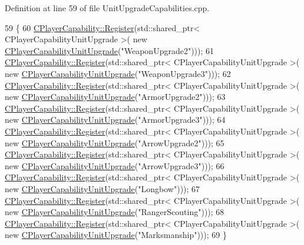 Definition at line 59 of file Unit\+Upgrade\+Capabilities.\+cpp.


\begin{DoxyCode}
59                                                     \{
60     \hyperlink{classCPlayerCapability_a7e298018dcde2684451add3cfff065f7}{CPlayerCapability::Register}(std::shared\_ptr< CPlayerCapabilityUnitUpgrade >(\textcolor{keyword}{
      new} \hyperlink{classCPlayerCapabilityUnitUpgrade_ac87129322f9f31cc271ee3de33502c56}{CPlayerCapabilityUnitUpgrade}(\textcolor{stringliteral}{"WeaponUpgrade2"})));   
61     \hyperlink{classCPlayerCapability_a7e298018dcde2684451add3cfff065f7}{CPlayerCapability::Register}(std::shared\_ptr< CPlayerCapabilityUnitUpgrade >(\textcolor{keyword}{
      new} \hyperlink{classCPlayerCapabilityUnitUpgrade_ac87129322f9f31cc271ee3de33502c56}{CPlayerCapabilityUnitUpgrade}(\textcolor{stringliteral}{"WeaponUpgrade3"})));
62     \hyperlink{classCPlayerCapability_a7e298018dcde2684451add3cfff065f7}{CPlayerCapability::Register}(std::shared\_ptr< CPlayerCapabilityUnitUpgrade >(\textcolor{keyword}{
      new} \hyperlink{classCPlayerCapabilityUnitUpgrade_ac87129322f9f31cc271ee3de33502c56}{CPlayerCapabilityUnitUpgrade}(\textcolor{stringliteral}{"ArmorUpgrade2"})));   
63     \hyperlink{classCPlayerCapability_a7e298018dcde2684451add3cfff065f7}{CPlayerCapability::Register}(std::shared\_ptr< CPlayerCapabilityUnitUpgrade >(\textcolor{keyword}{
      new} \hyperlink{classCPlayerCapabilityUnitUpgrade_ac87129322f9f31cc271ee3de33502c56}{CPlayerCapabilityUnitUpgrade}(\textcolor{stringliteral}{"ArmorUpgrade3"})));
64     \hyperlink{classCPlayerCapability_a7e298018dcde2684451add3cfff065f7}{CPlayerCapability::Register}(std::shared\_ptr< CPlayerCapabilityUnitUpgrade >(\textcolor{keyword}{
      new} \hyperlink{classCPlayerCapabilityUnitUpgrade_ac87129322f9f31cc271ee3de33502c56}{CPlayerCapabilityUnitUpgrade}(\textcolor{stringliteral}{"ArrowUpgrade2"})));
65     \hyperlink{classCPlayerCapability_a7e298018dcde2684451add3cfff065f7}{CPlayerCapability::Register}(std::shared\_ptr< CPlayerCapabilityUnitUpgrade >(\textcolor{keyword}{
      new} \hyperlink{classCPlayerCapabilityUnitUpgrade_ac87129322f9f31cc271ee3de33502c56}{CPlayerCapabilityUnitUpgrade}(\textcolor{stringliteral}{"ArrowUpgrade3"})));
66     \hyperlink{classCPlayerCapability_a7e298018dcde2684451add3cfff065f7}{CPlayerCapability::Register}(std::shared\_ptr< CPlayerCapabilityUnitUpgrade >(\textcolor{keyword}{
      new} \hyperlink{classCPlayerCapabilityUnitUpgrade_ac87129322f9f31cc271ee3de33502c56}{CPlayerCapabilityUnitUpgrade}(\textcolor{stringliteral}{"Longbow"})));
67     \hyperlink{classCPlayerCapability_a7e298018dcde2684451add3cfff065f7}{CPlayerCapability::Register}(std::shared\_ptr< CPlayerCapabilityUnitUpgrade >(\textcolor{keyword}{
      new} \hyperlink{classCPlayerCapabilityUnitUpgrade_ac87129322f9f31cc271ee3de33502c56}{CPlayerCapabilityUnitUpgrade}(\textcolor{stringliteral}{"RangerScouting"})));
68     \hyperlink{classCPlayerCapability_a7e298018dcde2684451add3cfff065f7}{CPlayerCapability::Register}(std::shared\_ptr< CPlayerCapabilityUnitUpgrade >(\textcolor{keyword}{
      new} \hyperlink{classCPlayerCapabilityUnitUpgrade_ac87129322f9f31cc271ee3de33502c56}{CPlayerCapabilityUnitUpgrade}(\textcolor{stringliteral}{"Marksmanship"})));
69 \}
\end{DoxyCode}
